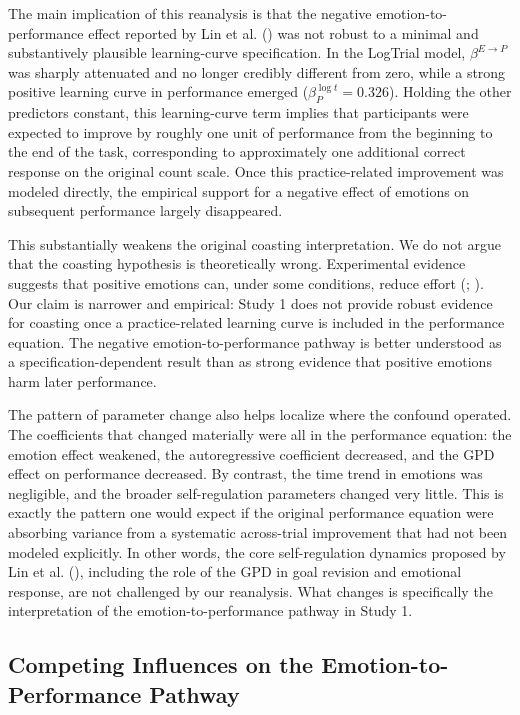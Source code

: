 \documentclass[
  man,
  floatsintext,
  longtable,
  nolmodern,
  notxfonts,
  notimes,
  colorlinks=true,linkcolor=blue,citecolor=blue,urlcolor=blue]{apa7}
\begin{document}
The main implication of this reanalysis is that the negative
emotion-to-performance effect reported by Lin et al.
() was not robust to a minimal and
substantively plausible learning-curve specification. In the LogTrial
model, \(\beta^{E \to P}\) was sharply attenuated and no longer credibly
different from zero, while a strong positive learning curve in
performance emerged (\(\beta^{\log t}_P = 0.326\)). Holding the other
predictors constant, this learning-curve term implies that participants
were expected to improve by roughly one unit of performance from the
beginning to the end of the task, corresponding to approximately one
additional correct response on the original count scale. Once this
practice-related improvement was modeled directly, the empirical support
for a negative effect of emotions on subsequent performance largely
disappeared.

This substantially weakens the original coasting interpretation. We do
not argue that the coasting hypothesis is theoretically wrong.
Experimental evidence suggests that positive emotions can, under some
conditions, reduce effort (; ). Our
claim is narrower and empirical: Study 1 does not provide robust
evidence for coasting once a practice-related learning curve is included
in the performance equation. The negative emotion-to-performance pathway
is better understood as a specification-dependent result than as strong
evidence that positive emotions harm later performance.

The pattern of parameter change also helps localize where the confound
operated. The coefficients that changed materially were all in the
performance equation: the emotion effect weakened, the autoregressive
coefficient decreased, and the GPD effect on performance decreased. By
contrast, the time trend in emotions was negligible, and the broader
self-regulation parameters changed very little. This is exactly the
pattern one would expect if the original performance equation were
absorbing variance from a systematic across-trial improvement that had
not been modeled explicitly. In other words, the core self-regulation
dynamics proposed by Lin et al. (),
including the role of the GPD in goal revision and emotional response,
are not challenged by our reanalysis. What changes is specifically the
interpretation of the emotion-to-performance pathway in Study 1.

\subsection{Competing Influences on the Emotion-to-Performance
Pathway}\label{competing-influences-on-the-emotion-to-performance-pathway}
\end{document}
